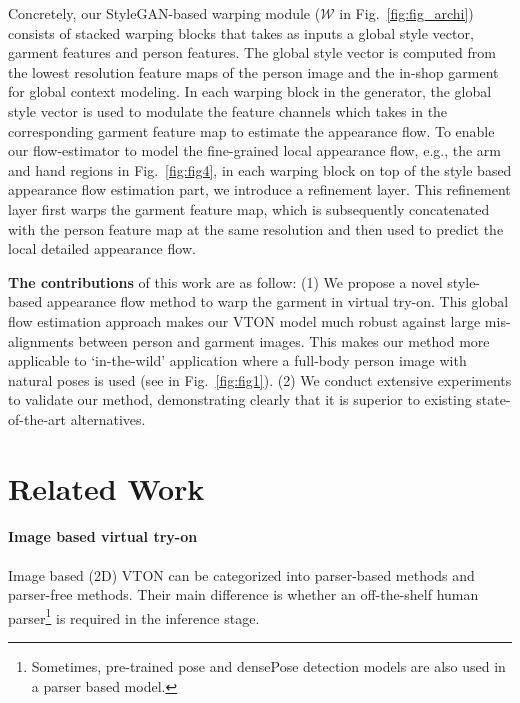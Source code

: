 \documentclass[10pt,twocolumn,letterpaper]{article}
\begin{document}
Concretely, our StyleGAN-based warping module ($\mathcal{W}$ in Fig.~\ref{fig:fig_archi}) consists of stacked warping blocks that takes as inputs  a global style vector, garment features and person features. The global style vector is  computed from  the lowest resolution feature maps of the person image and the in-shop garment for global context modeling. In each warping block in the generator, the global style vector is used to modulate the feature channels which takes in the corresponding garment feature map to estimate the appearance flow. To enable our flow-estimator to model the fine-grained local appearance flow, e.g., the arm and hand regions in Fig.~\ref{fig:fig4}, in each warping block on top of the style based appearance flow estimation part, we introduce a refinement layer. This refinement layer first warps the garment feature map, which is subsequently  concatenated with the person feature map at the same resolution and then used to predict the local detailed appearance flow. 

\textbf{The contributions} of this work are as follow: (1) We propose a novel style-based appearance flow method to warp the garment in virtual try-on. This global flow estimation approach makes our VTON model much robust against large mis-alignments between person and garment images. This makes our method more applicable to `in-the-wild' application where a full-body person image with natural poses is used (see in Fig.~\ref{fig:fig1}). (2) We conduct extensive experiments to validate our method, demonstrating clearly that it is superior to existing state-of-the-art alternatives. 


\section{Related Work}
\paragraph{Image based virtual try-on} Image based (2D) VTON can be categorized into parser-based methods and parser-free methods. Their main difference is whether an off-the-shelf human parser\footnote{Sometimes, pre-trained pose \cite{cao2017realtime} and densePose \cite{guler2018densepose} detection models are also used in a parser based model.} is required in the inference stage.
\end{document}
